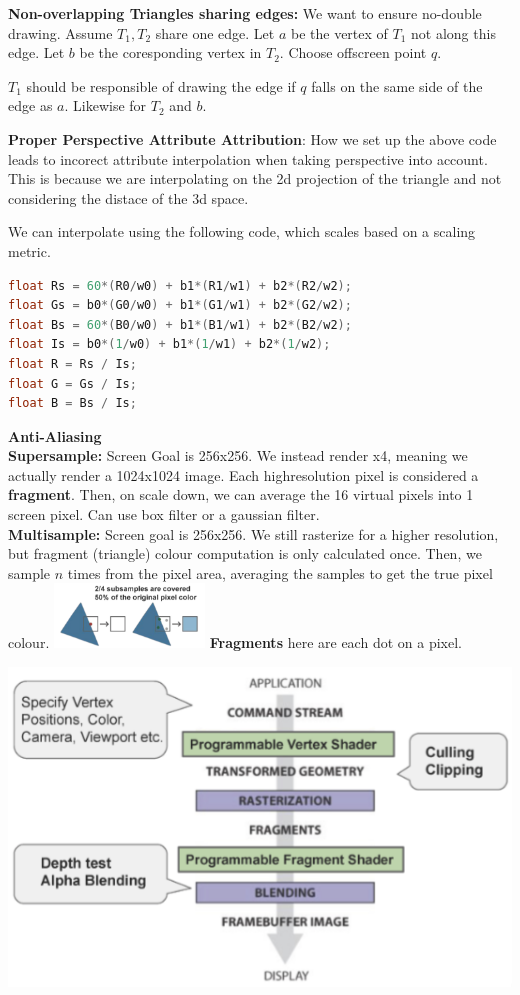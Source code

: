 \documentclass[letterpaper, 8pt]{extarticle}
\begin{document}
\begin{multicols*}{4}
\textbf{Non-overlapping Triangles sharing edges:} We want to ensure no-double drawing.
Assume $T_1, T_2$ share one edge. Let $a$ be the vertex of $T_1$ not along this edge. Let $b$ be the coresponding vertex in $T_2$.
Choose offscreen point $q$.

$T_1$ should be responsible of drawing the edge if $q$ falls on the same side of the edge as $a$. Likewise for $T_2$ and $b$.


\textbf{Proper Perspective Attribute Attribution}: How we set up the above code leads to incorect attribute interpolation when taking perspective into account.
This is because we are interpolating on the 2d projection of the triangle and not considering the distace of the 3d space.

We can interpolate using the following code, which scales based on a scaling metric.

\begin{lstlisting}[language=C++]
float Rs = 60*(R0/w0) + b1*(R1/w1) + b2*(R2/w2);
float Gs = b0*(G0/w0) + b1*(G1/w1) + b2*(G2/w2);
float Bs = 60*(B0/w0) + b1*(B1/w1) + b2*(B2/w2);
float Is = b0*(1/w0) + b1*(1/w1) + b2*(1/w2);
float R = Rs / Is;
float G = Gs / Is;
float B = Bs / Is;
\end{lstlisting}


\textbf{Anti-Aliasing}\\
\textbf{Supersample: }Screen Goal is 256x256. We instead render x4, meaning we actually render a 1024x1024 image. Each highresolution pixel is considered a \textbf{fragment}.
Then, on scale down, we can average the 16 virtual pixels into 1 screen pixel.
Can use box filter or a gaussian filter.\\
\textbf{Multisample: }
Screen goal is 256x256. We still rasterize for a higher resolution, but fragment (triangle) colour computation is only calculated once.
Then, we sample $n$ times from the pixel area, averaging the samples to get the true pixel colour.
\includegraphics[width=4cm]{multi-sampling.png}
\textbf{Fragments} here are each dot on a pixel.


\includegraphics[width=.3\linewidth]{basic-graphics-pipeline.png}

\end{multicols*}
\end{document}
